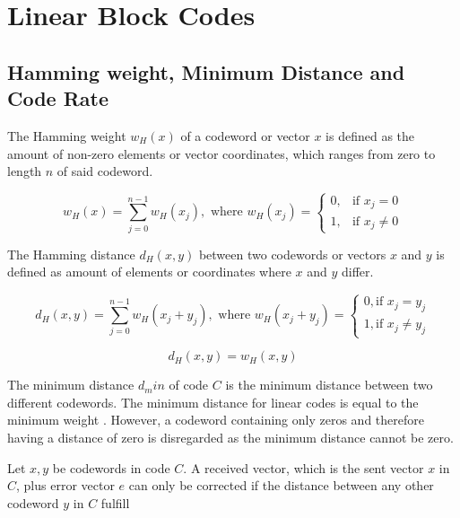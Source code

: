 \documentclass[../main.tex]{subfiles}
\begin{document}
    \chapter{Linear Block Codes}

    \section{Hamming weight, Minimum Distance and Code Rate}
    The Hamming weight $w_H(x)$ of a codeword or vector $x$ is defined as the amount of non-zero elements or vector coordinates, which ranges from zero to length $n$ of said codeword.

    \begin{equation*}
        w_H(x) = \sum_{j=0}^{n-1} w_H(x_j), \text{ where } w_H(x_j) =
        \begin{cases}
            0, &\text{if } x_j = 0 \\
            1, &\text{if } x_j \neq 0
        \end{cases}
    \end{equation*}

    \noindent
    The Hamming distance $d_H(x,y)$ between two codewords or vectors $x$ and $y$ is defined as amount of elements or coordinates where $x$ and $y$ differ.

    \begin{equation*}
        d_H(x,y) = \sum_{j=0}^{n-1} w_H(x_j+y_j), \text{ where } w_H(x_j+y_j) =
        \begin{cases}
            0, \text{if } x_j=y_j \\
            1, \text{if } x_j \neq y_j
        \end{cases}
    \end{equation*}

    \begin{equation*}
        d_H(x,y) =  w_H(x,y)
    \end{equation*}

    \noindent
    The minimum distance $d_min$ of code $C$ is the minimum distance between two different codewords. The minimum distance for linear codes is equal to the minimum weight \autocite{bossert1999channel}. However, a codeword containing only zeros and therefore having a distance of zero is disregarded as the minimum distance cannot be zero.


    Let $x,y$ be codewords in code $C$. A received vector, which is the sent vector $x$ in $C$, plus error vector $e$ can only be corrected if the distance between any other codeword $y$ in $C$ fulfill
\end{document}
